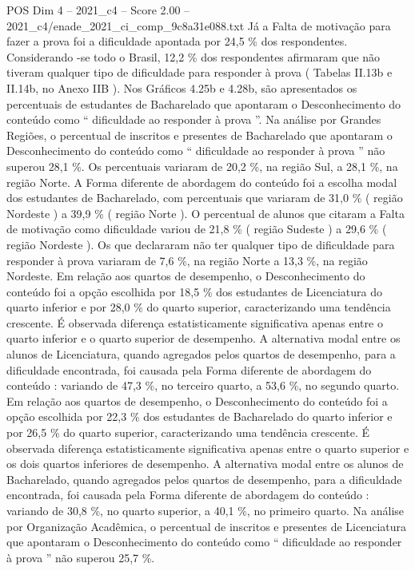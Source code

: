 \begin{textsample}{POS Dim 4 – 2021\_c4 – Score 2.00 – 2021\_c4/enade\_2021\_ci\_comp\_9c8a31e088.txt}
Já a Falta de motivação para fazer a prova foi a dificuldade apontada por 24,5 \% dos respondentes.
Considerando -se todo o Brasil, 12,2 \% dos respondentes afirmaram que não tiveram qualquer tipo de dificuldade para responder à prova ( Tabelas II.13b e II.14b, no Anexo IIB ).
Nos Gráficos 4.25b e 4.28b, são apresentados os percentuais de estudantes de Bacharelado que apontaram o Desconhecimento do conteúdo como “ dificuldade ao responder à prova ”.
Na análise por Grandes Regiões, o percentual de inscritos e presentes de Bacharelado que apontaram o Desconhecimento do conteúdo como “ dificuldade ao responder à prova ” não superou 28,1 \%.
Os percentuais variaram de 20,2 \%, na região Sul, a 28,1 \%, na região Norte.
A Forma diferente de abordagem do conteúdo foi a escolha modal dos estudantes de Bacharelado, com percentuais que variaram de 31,0 \% ( região Nordeste ) a 39,9 \% ( região Norte ).
O percentual de alunos que citaram a Falta de motivação como dificuldade variou de 21,8 \% ( região Sudeste ) a 29,6 \% ( região Nordeste ).
Os que declararam não ter qualquer tipo de dificuldade para responder à prova variaram de 7,6 \%, na região Norte a 13,3 \%, na região Nordeste.
Em relação aos quartos de desempenho, o Desconhecimento do conteúdo foi a opção escolhida por 18,5 \% dos estudantes de Licenciatura do quarto inferior e por 28,0 \% do quarto superior, caracterizando uma tendência crescente.
É observada diferença estatisticamente significativa apenas entre o quarto inferior e o quarto superior de desempenho.
A alternativa modal entre os alunos de Licenciatura, quando agregados pelos quartos de desempenho, para a dificuldade encontrada, foi causada pela Forma diferente de abordagem do conteúdo : variando de 47,3 \%, no terceiro quarto, a 53,6 \%, no segundo quarto.
Em relação aos quartos de desempenho, o Desconhecimento do conteúdo foi a opção escolhida por 22,3 \% dos estudantes de Bacharelado do quarto inferior e por 26,5 \% do quarto superior, caracterizando uma tendência crescente.
É observada diferença estatisticamente significativa apenas entre o quarto superior e os dois quartos inferiores de desempenho.
A alternativa modal entre os alunos de Bacharelado, quando agregados pelos quartos de desempenho, para a dificuldade encontrada, foi causada pela Forma diferente de abordagem do conteúdo : variando de 30,8 \%, no quarto superior, a 40,1 \%, no primeiro quarto.
Na análise por Organização Acadêmica, o percentual de inscritos e presentes de Licenciatura que apontaram o Desconhecimento do conteúdo como “ dificuldade ao responder à prova ” não superou 25,7 \%.

\end{textsample}
